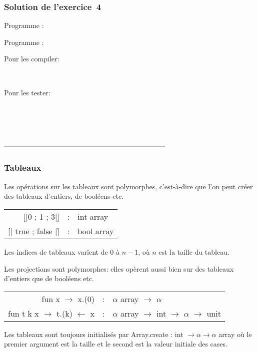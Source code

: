 %
\begin{frame}
\frametitle{Solution de l'exercice~4}

Programme \Xtrue: 

Programme \Xfalse: 

Pour les compiler:

\\

Pour les tester:

\\
\\
\\

\end{frame}

---------------------------------------------------------------------
%
\begin{frame}
\frametitle{Tableaux}

Les opérations sur les tableaux sont polymorphes, c'est-à-dire que
l'on peut créer des tableaux  d'entiers, de booléens
etc. 

\begin{center}
\begin{tabular}{rcl}
  \textsf{[|0 ; 1 ; 3|]} & : & \textsf{int array}\\
  \textsf{[| true ; false |]} & : & \textsf{bool array}
\end{tabular}
\end{center}

Les indices de tableaux varient de $0$ à $n-1$, où $n$ est la taille
du tableau.

Les projections sont polymorphes: elles opèrent aussi bien sur des
tableaux d'entiers que de booléens etc.

\begin{center}
\begin{tabular}{rcl}
    \textsf{fun x $\rightarrow$ x.(0)} 
  & :
  & \textsf{$\alpha$ array $\rightarrow$ $\alpha$}\\
    \textsf{fun t k x $\rightarrow$ t.(k) $\leftarrow$ x}
  & :
  & \textsf{$\alpha$ array $\rightarrow$ int $\rightarrow$ $\alpha$
       $\rightarrow$ unit}
\end{tabular}
\end{center}

Les tableaux sont toujours initialisés par \textsf{Array.create : int
$\rightarrow \alpha \rightarrow \alpha$ array} où le premier
argument est la taille et le second est la valeur initiale des cases.

\end{frame}


